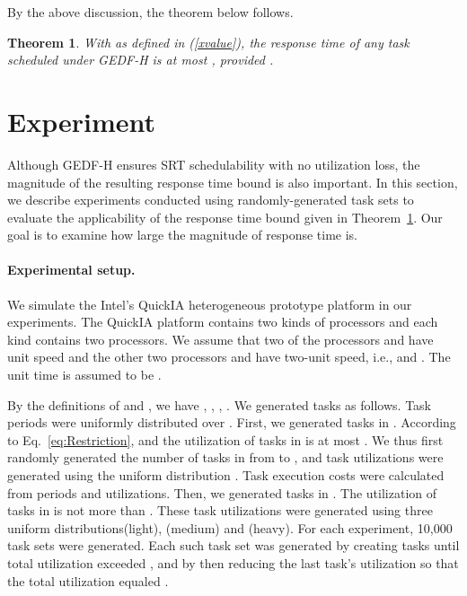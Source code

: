 \documentclass[Times, 10pt,twocolumn]{article}
\newtheorem{theorem}{\textbf{Theorem}}
\theoremstyle{definition}
\begin{document}
By the above discussion, the theorem below follows.


\begin{theorem}
\label{theorem:SRTtest}
With  as defined in (\ref{xvalue}), the response time of any task  scheduled under GEDF-H is at most , provided .
\end{theorem}






\section{Experiment}
\label{sec:Experiment}

Although GEDF-H ensures SRT schedulability with no utilization loss, the magnitude of the resulting response time bound is also important. In this section, we describe experiments conducted using randomly-generated task sets to evaluate the applicability of the response time bound given in Theorem~\ref{theorem:SRTtest}. Our goal is to examine how large the magnitude of response time is.

\paragraph{Experimental setup.} We simulate the Intel's QuickIA heterogeneous prototype platform \cite{chitlur2012quickia} in our experiments. The QuickIA platform contains two kinds of processors and each kind contains two processors. We assume that two of the processors  and  have unit speed and the other two processors  and  have two-unit speed, i.e.,  and . The unit time is assumed to be .



By the definitions of  and , we have , , , . We generated tasks as follows. Task periods were uniformly distributed over . First, we generated tasks in . According to Eq.~\ref{eq:Restriction},   and the utilization of tasks in  is at most . We thus first randomly generated the number of tasks in  from  to , and task utilizations were generated using the uniform distribution . Task execution costs were calculated from periods and utilizations. Then, we generated tasks in . The utilization of tasks in  is not more than . These task utilizations were generated using three uniform distributions(light), (medium) and (heavy). For each experiment, 10,000 task sets were generated. Each such task set was generated by creating tasks until total utilization exceeded , and by then reducing the last task's utilization so that the total utilization equaled .
\end{document}
